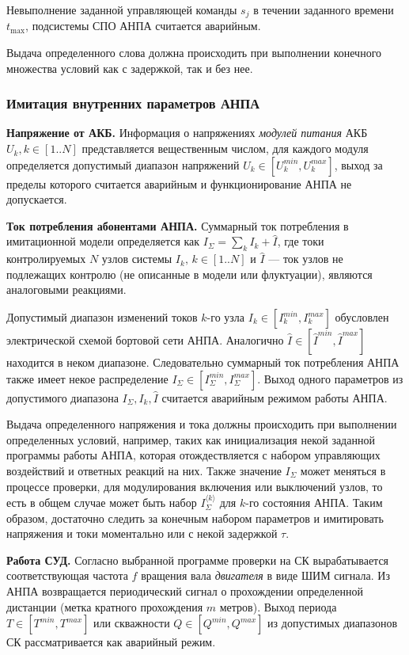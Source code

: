 Невыполнение заданной управляющей команды $s_j$ в течении заданного времени $t_{\mbox{max}}$,
подсистемы СПО АНПА считается аварийным.

Выдача определенного слова должна происходить при выполнении конечного множества условий как с задержкой, так и без нее.


\subsubsection{Имитация внутренних параметров АНПА}\label{sec:model_anpa:inner_params}
\textbf{Напряжение от АКБ.}
Информация о напряжениях \textit{модулей питания} АКБ $U_k, k\in [1..N]$ представляется вещественным числом,
для каждого модуля определяется допустимый диапазон напряжений $U_k \in [U_k^{min}, U_k^{max}]$,
выход за пределы которого считается аварийным и функционирование АНПА не допускается.

\textbf{Ток потребления абонентами АНПА.}
Суммарный ток потребления в имитационной модели определяется как $I_\Sigma = \sum_k I_k + \hat I$,
где токи контролируемых $N$ узлов системы $I_k,\, k\in[1..N]$ и $\hat I$ --- ток узлов не подлежащих контролю (не описанные в модели или флуктуации),
являются аналоговыми реакциями. %

Допустимый диапазон изменений токов $k$-го узла $I_k \in [I_k^{min}, I_k^{max}]$ обусловлен электрической схемой бортовой сети АНПА.
Аналогично $\hat I \in [\hat I^{min}, \hat I^{max}]$ находится в неком диапазоне.
Следовательно суммарный ток потребления АНПА также имеет некое распределение $I_\Sigma \in [I_\Sigma^{min}, I_\Sigma^{max}]$.
Выход одного параметров из допустимого диапазона $I_\Sigma, I_k, \hat I$ считается аварийным режимом работы АНПА.

Выдача определенного напряжения и тока должны происходить при выполнении определенных условий,
например, таких как инициализация некой заданной программы работы АНПА, которая
отождествляется с набором управляющих воздействий и ответных реакций на них.
Также значение $I_\Sigma$ может меняться в процессе проверки, для модулирования включения или выключений узлов,
то есть в общем случае может быть набор $I_\Sigma^{\langle k \rangle}$ для $k$-го состояния АНПА.
Таким образом, достаточно следить за конечным набором параметров и
имитировать напряжения и токи моментально или с некой задержкой $\tau$.

\textbf{Работа СУД.}
Согласно выбранной программе проверки на СК вырабатывается соответствующая 
частота $f$ вращения вала \textit{двигателя} в виде ШИМ сигнала.
Из АНПА возвращается периодический сигнал о прохождении определенной дистанции (метка кратного прохождения $m$ метров).
Выход периода $T \in [T^{min}, T^{max}]$ или скважности $Q \in [Q^{min}, Q^{max}]$ из допустимых диапазонов
СК рассматривается как аварийный режим.

